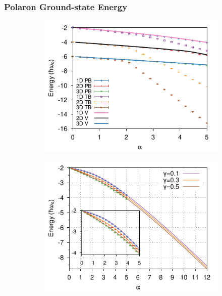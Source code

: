 \subsubsection{Polaron Ground-state Energy}

\begin{figure}
  \begin{subfigure}[b]{0.49\textwidth}
    \includegraphics[width=\textwidth]{figures/holstein-1dto3d-alpha-energy-omega-diagmc-COLOUR.pdf}
  \end{subfigure}
  \begin{subfigure}[b]{0.49\textwidth}
    \includegraphics[width=\textwidth]{figures/holstein-1d-alpha-energy-adiabaticity-diagmc-COLOUR.pdf}
  \end{subfigure}

\end{figure}

